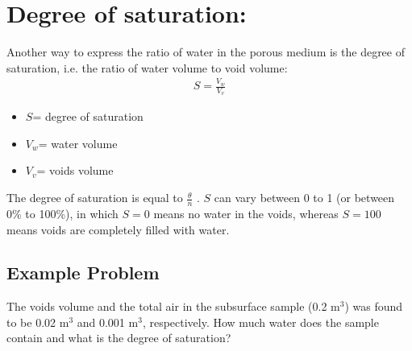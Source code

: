 \documentclass[letterpaper,10pt,english]{jupyterBook}
\begin{document}
\section{Degree of saturation:}
\label{\detokenize{content/flow/12_subsurface_structure:degree-of-saturation}}
\sphinxAtStartPar
Another way to express the ratio of water in the porous medium is the degree of saturation, i.e. the ratio of water volume to void volume:
\begin{equation*}
\begin{split}{S}=\frac{V_{w}}{V_{v}}\end{split}
\end{equation*}\begin{itemize}
\item {} 
\sphinxAtStartPar
\({S}\)= degree of saturation

\item {} 
\sphinxAtStartPar
\({V_{w}}\)= water volume

\item {} 
\sphinxAtStartPar
\({V_{v}}\)= voids volume

\end{itemize}

\sphinxAtStartPar
The degree of saturation is equal to \(\frac{\theta}{n}\) . \(S\) can vary between 0 to 1 (or between 0\% to 100\%), in which \(S=0\) means no water in the voids, whereas \(S=100\) means voids are completely filled with water.


\subsection{Example Problem}
\label{\detokenize{content/flow/12_subsurface_structure:id7}}
\sphinxAtStartPar
The voids volume and the total air in the subsurface sample (0.2 m\(^3\)) was found to be 0.02 m\(^3\) and 0.001 m\(^3\), respectively. How much water does the sample contain and what is the degree of saturation?
\end{document}

